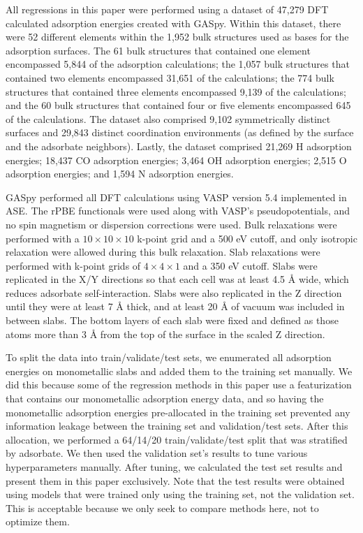 \documentclass[]{achemso}
\begin{document}
All regressions in this paper were performed using a dataset of 47,279 \gls{DFT} calculated adsorption energies created with \gls{GASpy}\cite{Tran2018, Tran2018a}.
Within this dataset, there were 52 different elements within the 1,952 bulk structures used as bases for the adsorption surfaces.
The 61 bulk structures that contained one element encompassed 5,844 of the adsorption calculations; the 1,057 bulk structures that contained two elements encompassed 31,651 of the calculations; the 774 bulk structures that contained three elements encompassed 9,139 of the calculations; and the 60 bulk structures that contained four or five elements encompassed 645 of the calculations.
The dataset also comprised 9,102 symmetrically distinct surfaces and 29,843 distinct coordination environments (as defined by the surface and the adsorbate neighbors).
Lastly, the dataset comprised 21,269 H adsorption energies; 18,437 CO adsorption energies; 3,464 OH adsorption energies; 2,515 O adsorption energies; and 1,594 N adsorption energies.

\gls{GASpy} performed all \gls{DFT} calculations using \gls{VASP}\cite{Kresse1993, Kresse1994, Kresse1996, Kresse1996a} version 5.4 implemented in \gls{ASE}\cite{HjorthLarsen2017}.
The \gls{rPBE} functionals\cite{Hammer1999} were used along with \gls{VASP}'s pseudopotentials, and no spin magnetism or dispersion corrections were used.
Bulk relaxations were performed with a $10\times10\times10$ k-point grid and a 500 \gls{eV} cutoff, and only isotropic relaxation were allowed during this bulk relaxation.
Slab relaxations were performed with k-point grids of $4\times4\times1$ and a 350 \gls{eV} cutoff.
Slabs were replicated in the X/Y directions so that each cell was at least 4.5 \AA{} wide, which reduces adsorbate self-interaction.
Slabs were also replicated in the Z direction until they were at least 7 \AA{} thick, and at least 20 \AA{} of vacuum was included in between slabs.
The bottom layers of each slab were fixed and defined as those atoms more than 3 \AA{} from the top of the surface in the scaled Z direction.

To split the data into train/validate/test sets, we enumerated all adsorption energies on monometallic slabs and added them to the training set manually. 
We did this because some of the regression methods in this paper use a featurization that contains our monometallic adsorption energy data\cite{Tran2018}, and so having the monometallic adsorption energies pre-allocated in the training set prevented any information leakage between the training set and validation/test sets.
After this allocation, we performed a 64/14/20 train/validate/test split that was stratified\cite{Thompson2012} by adsorbate.
We then used the validation set's results to tune various hyperparameters manually.
After tuning, we calculated the test set results and present them in this paper exclusively.
Note that the test results were obtained using models that were trained only using the training set, not the validation set.
This is acceptable because we only seek to compare methods here, not to optimize them.
\end{document}
